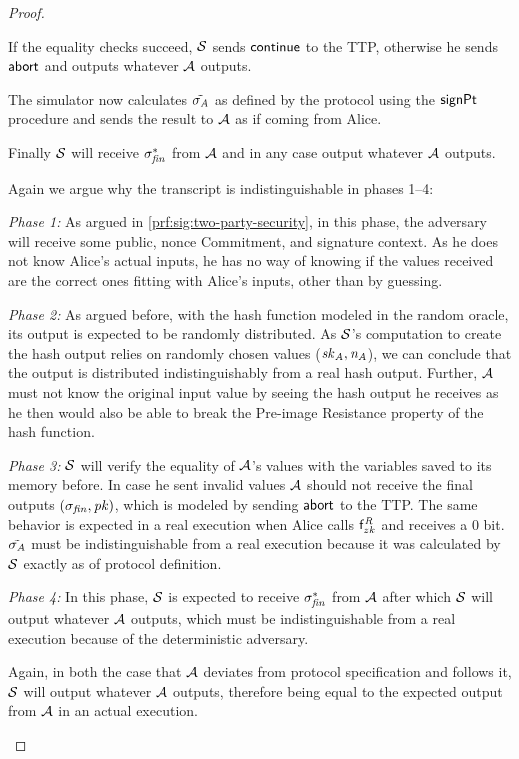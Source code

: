 \begin{proof}
\begin{asparaenum}
        If the equality checks succeed, $\mathcal{S}$ sends $\mathsf{continue}$ to the TTP, otherwise he sends $\mathsf{abort}$ and outputs whatever $\mathcal{A}$ outputs.
        \item The simulator now calculates $\tilde{\sigma_{\mathit{A}}}$ as defined by the protocol using the $\mathsf{signPt}$ procedure and sends the result to $\mathcal{A}$ as if coming from Alice.
        \item Finally $\mathcal{S}$ will receive $\sigma_{\mathit{fin}}^*$ from $\mathcal{A}$ and in any case output whatever $\mathcal{A}$ outputs.
    \end{asparaenum}
    
    Again we argue why the transcript is indistinguishable in phases 1--4:
    \begin{asparaitem}
        \item \textit{Phase 1:} As argued in \cref{prf:sig:two-party-security}, in this phase, the adversary will receive some public, nonce Commitment, and signature context.
        As he does not know Alice's actual inputs, he has no way of knowing if the values received are the correct ones fitting with Alice's inputs, other than by guessing.
        \item \textit{Phase 2:} As argued before, with the hash function modeled in the random oracle, its output is expected to be randomly distributed.
        As $\mathcal{S}$'s computation to create the hash output relies on randomly chosen values ($\mathit{sk}_{\mathit{A}}, \mathit{\mathit{n}_{\mathit{A}}}$), we can conclude that the output is distributed indistinguishably from a real hash output.
        Further, $\mathcal{A}$ must not know the original input value by seeing the hash output he receives as he then would also be able to break the Pre-image Resistance property of the hash function.
        \item \textit{Phase 3:} $\mathcal{S}$ will verify the equality of $\mathcal{A}$'s values with the variables saved to its memory before.
        In case he sent invalid values $\mathcal{A}$ should not receive the final outputs $(\sigma_{\mathit{fin}}, \mathit{pk})$, which is modeled by sending $\mathsf{abort}$ to the TTP.
        The same behavior is expected in a real execution when Alice calls $\mathsf{f}^{\mathit{R}}_{zk}$ and receives a 0 bit.
        $\tilde{\sigma_{\mathit{A}}}$ must be indistinguishable from a real execution because it was calculated by $\mathcal{S}$ exactly as of protocol definition.
        \item \textit{Phase 4:} In this phase, $\mathcal{S}$ is expected to receive $\sigma_{\mathit{fin}}^*$ from $\mathcal{A}$ after which $\mathcal{S}$ will output whatever $\mathcal{A}$ outputs, which must be indistinguishable from a real execution because of the deterministic adversary.
        \item Again, in both the case that $\mathcal{A}$ deviates from protocol specification and follows it, $\mathcal{S}$ will output whatever $\mathcal{A}$ outputs, therefore being equal to the expected output from $\mathcal{A}$ in an actual execution.
    \end{asparaitem}


\end{proof}
